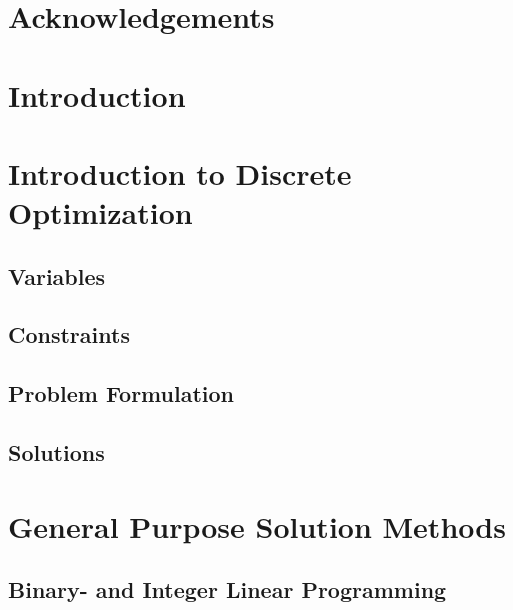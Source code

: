 \documentclass[a4paper,11pt]{article}
\begin{document}


\thispagestyle{empty}
\section{Acknowledgements}

\tableofcontents
\thispagestyle{empty}

\newpage
\setcounter{page}{1}
\section{Introduction}
 
 \newpage
 
\section{Introduction to Discrete Optimization}

  \subsection{Variables} 
  \subsection{Constraints}
  \subsection{Problem Formulation} %
  
  \subsection{Solutions}
  
  
\newpage  
\section{General Purpose Solution Methods}  
  
  \subsection{Binary- and Integer Linear Programming} %
  
  
\end{document}
